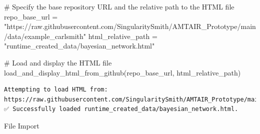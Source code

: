 \documentclass[
  11pt,
  letterpaper,
]{book}
\newenvironment{Shaded}{\begin{snugshade}}{\end{snugshade}}
\newcommand{\CommentTok}[1]{\textcolor[rgb]{0.37,0.37,0.37}{#1}}
\newcommand{\NormalTok}[1]{\textcolor[rgb]{0.00,0.23,0.31}{#1}}
\newcommand{\OperatorTok}[1]{\textcolor[rgb]{0.37,0.37,0.37}{#1}}
\newcommand{\StringTok}[1]{\textcolor[rgb]{0.13,0.47,0.30}{#1}}
\begin{document}
\begin{Shaded}
\begin{Highlighting}[]
\CommentTok{\# Specify the base repository URL and the relative path to the HTML file}
\NormalTok{repo\_base\_url }\OperatorTok{=} \StringTok{"https://raw.githubusercontent.com/SingularitySmith/AMTAIR\_Prototype/main/data/example\_carlsmith"}
\NormalTok{html\_relative\_path }\OperatorTok{=} \StringTok{"runtime\_created\_data/bayesian\_network.html"}

\CommentTok{\# Load and display the HTML file}
\NormalTok{load\_and\_display\_html\_from\_github(repo\_base\_url, html\_relative\_path)}
\end{Highlighting}
\end{Shaded}

\begin{verbatim}
Attempting to load HTML from: https://raw.githubusercontent.com/SingularitySmith/AMTAIR_Prototype/main/data/example_carlsmith/runtime_created_data/bayesian_network.html
✅ Successfully loaded runtime_created_data/bayesian_network.html.
\end{verbatim}

\label{file_import}
File Import
\end{document}
